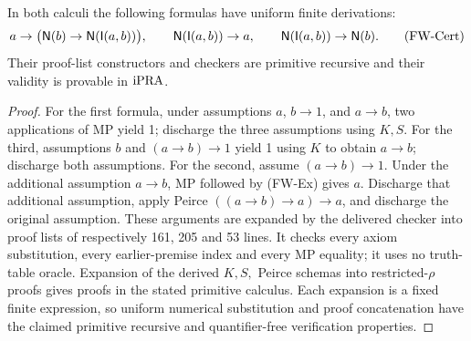 \begin{fwlemma}
In both calculi the following formulas have uniform finite derivations:
\[
 a\to\bigl(\mathsf N(b)\to\mathsf N(\mathsf I(a,b))\bigr),\qquad
 \mathsf N(\mathsf I(a,b))\to a,\qquad
 \mathsf N(\mathsf I(a,b))\to\mathsf N(b).                              \tag{FW-Cert}
\]
Their proof-list constructors and checkers are primitive recursive and
their validity is provable in $\mathrm{iPRA}$.
\end{fwlemma}
\begin{proof}
For the first formula, under assumptions $a$, $b\to1$, and $a\to b$,
two applications of MP yield 1; discharge the three assumptions using
$K,S$.  For the third, assumptions $b$ and $(a\to b)\to1$ yield 1
using $K$ to obtain $a\to b$; discharge both assumptions.  For the
second, assume $(a\to b)\to1$.  Under the additional assumption
$a\to b$, MP followed by (FW-Ex) gives $a$.  Discharge that additional
assumption, apply Peirce $((a\to b)\to a)\to a$, and discharge the
original assumption.  These arguments are expanded by the delivered
checker into proof lists of respectively 161, 205 and 53 lines.  It
checks every axiom substitution, every earlier-premise index and every
MP equality; it uses no truth-table oracle.  Expansion of the derived
$K,S,$ Peirce schemas into restricted-$\rho$ proofs gives proofs in the
stated primitive calculus.  Each expansion is a fixed finite expression,
so uniform numerical substitution and proof concatenation have the
claimed primitive recursive and quantifier-free verification properties.
\end{proof}

